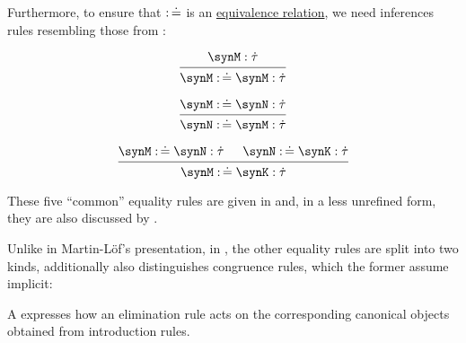 \begin{remark}
\begin{thmenum}
    Furthermore, to ensure that \( {\syncoloneqq} \) is an \hyperref[def:equivalence_relation]{equivalence relation}, we need inferences rules resembling those from :
    \begingroup
    \begin{paracol}{3}
      \begin{nthcolumn}{0}
        \phantom{alignment hack}
        \begin{equation*}
          \begin{prooftree}
            \hypo{ \synM: \syn\tau }
            \infer1{ \synM \syncoloneqq \synM: \syn\tau }
          \end{prooftree}
        \end{equation*}
      \end{nthcolumn}

      \begin{nthcolumn}{1}
        \phantom{alignment hack}
        \begin{equation*}
          \begin{prooftree}
            \hypo{ \synM \syncoloneqq \synN: \syn\tau }
            \infer1{ \synN \syncoloneqq \synM: \syn\tau }
          \end{prooftree}
        \end{equation*}
      \end{nthcolumn}

      \begin{nthcolumn}{2}
        \phantom{alignment hack}
        \begin{equation*}
          \begin{prooftree}
            \hypo{ \synM \syncoloneqq \synN: \syn\tau }
            \hypo{ \synN \syncoloneqq \synK: \syn\tau }
            \infer2{ \synM \syncoloneqq \synK: \syn\tau }
          \end{prooftree}
        \end{equation*}
      \end{nthcolumn}
    \end{paracol}
    \endgroup

    These five \enquote{common} equality rules are given in \cite[433]{UnivalentProject2024OctoberHoTT} and, in a less unrefined form, they are also discussed by .

    Unlike in Martin-L\"of's presentation, in \cite[27]{UnivalentProject2024OctoberHoTT}, the other equality rules are split into two kinds, additionally  also distinguishes congruence rules, which the former assume implicit:
    \begin{thmenum}
       A  expresses how an elimination rule acts on the corresponding canonical objects obtained from introduction rules.


\end{thmenum}
\end{thmenum}
\end{remark}
